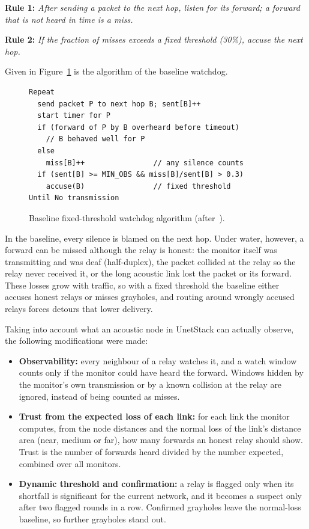 \documentclass[conference]{IEEEtran}
\begin{document}
\textbf{Rule 1:} \emph{After sending a packet to the next hop, listen for its forward; a forward that is not heard in time is a miss.}

\textbf{Rule 2:} \emph{If the fraction of misses exceeds a fixed threshold (30\%), accuse the next hop.}

Given in Figure~\ref{fig:baseline} is the algorithm of the baseline watchdog.

\begin{figure}[t]
\begin{lstlisting}
Repeat
  send packet P to next hop B; sent[B]++
  start timer for P
  if (forward of P by B overheard before timeout)
    // B behaved well for P
  else
    miss[B]++                // any silence counts
  if (sent[B] >= MIN_OBS && miss[B]/sent[B] > 0.3)
    accuse(B)                // fixed threshold
Until No transmission
\end{lstlisting}
\caption{Baseline fixed-threshold watchdog algorithm (after~\cite{marti}).}\label{fig:baseline}
\end{figure}

In the baseline, every silence is blamed on the next hop. Under water, however, a forward can be missed although the relay is honest: the monitor itself was transmitting and was deaf (half-duplex), the packet collided at the relay so the relay never received it, or the long acoustic link lost the packet or its forward. These losses grow with traffic, so with a fixed threshold the baseline either accuses honest relays or misses grayholes, and routing around wrongly accused relays forces detours that lower delivery.

Taking into account what an acoustic node in UnetStack can actually observe, the following modifications were made:
\begin{itemize}
\item \textbf{Observability:} every neighbour of a relay watches it, and a watch window counts only if the monitor could have heard the forward. Windows hidden by the monitor's own transmission or by a known collision at the relay are ignored, instead of being counted as misses.
\item \textbf{Trust from the expected loss of each link:} for each link the monitor computes, from the node distances and the normal loss of the link's distance area (near, medium or far), how many forwards an honest relay should show. Trust is the number of forwards heard divided by the number expected, combined over all monitors.
\item \textbf{Dynamic threshold and confirmation:} a relay is flagged only when its shortfall is significant for the current network, and it becomes a suspect only after two flagged rounds in a row. Confirmed grayholes leave the normal-loss baseline, so further grayholes stand out.
\end{itemize}
\end{document}
